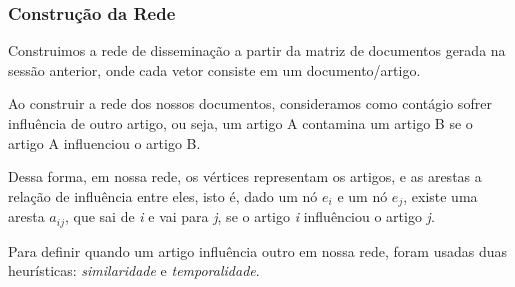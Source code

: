 \documentclass[a4paper,12pt]{article}
\begin{document}
\subsubsection{Construção da Rede}

 Construimos a rede de disseminação a partir da matriz de documentos gerada na sessão anterior, onde cada vetor consiste em um documento/artigo.
 
 Ao construir a rede dos nossos documentos,
 consideramos como contágio sofrer influência de outro artigo, ou seja, um artigo A contamina um artigo B se o artigo A influenciou o
 artigo B.
 
 Dessa forma, em nossa rede, os vértices representam os artigos, e as arestas a relação de influência entre eles, isto é, dado um nó $e_{i}$ e um nó
 $e_{j}$, existe uma aresta $a_{ij}$, que sai de \textit{i} e vai para \textit{j}, se o artigo \textit{i} influênciou o artigo \textit{j}.
 
 Para definir quando um artigo influência outro em nossa rede, foram usadas duas heurísticas: \textit{similaridade} e 
 \textit{temporalidade}.
 
\end{document}
